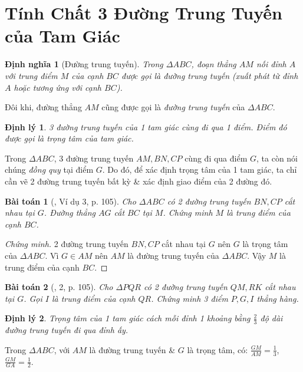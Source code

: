 \documentclass{article}
\newtheorem{baitoan}{Bài toán}
\newtheorem{dinhly}{Định lý}
\newtheorem{dinhnghia}{Định nghĩa}
\begin{document}

\section{Tính Chất 3 Đường Trung Tuyến của Tam Giác}

\begin{dinhnghia}[Đường trung tuyến]
	Trong $\Delta ABC$, đoạn thẳng $AM$ nối đỉnh $A$ với trung điểm $M$ của cạnh $BC$ được gọi là \emph{đường trung tuyến} (xuất phát từ đỉnh $A$ hoặc tương ứng với cạnh $BC$).
\end{dinhnghia}
Đôi khi, đường thẳng $AM$ cũng được gọi là \textit{đường trung tuyến} của $\Delta ABC$.

\begin{dinhly}
	3 đường trung tuyến của 1 tam giác cùng đi qua 1 điểm. Điểm đó được gọi là \emph{trọng tâm} của tam giác.
\end{dinhly}
Trong $\Delta ABC$, 3 đường trung tuyến $AM,BN,CP$ cùng đi qua điểm $G$, ta còn nói chúng \textit{đồng quy} tại điểm $G$. Do đó, để xác định trọng tâm của 1 tam giác, ta chỉ cần vẽ 2 đường trung tuyến bất kỳ \& xác định giao điểm của 2 đường đó.

\begin{baitoan}[\cite{SGK_Toan_7_Canh_Dieu_tap_2}, Ví dụ 3, p. 105]
	Cho $\Delta ABC$ có 2 đường trung tuyến $BN,CP$ cắt nhau tại $G$. Đường thẳng $AG$ cắt $BC$ tại $M$. Chứng minh $M$ là trung điểm của cạnh $BC$.
\end{baitoan}

\begin{proof}[Chứng minh]
	2 đường trung tuyến $BN,CP$ cắt nhau tại $G$ nên $G$ là trọng tâm của $\Delta ABC$. Vì $G\in AM$ nên $AM$ là đường trung tuyến của $\Delta ABC$. Vậy $M$ là trung điểm của cạnh $BC$.
\end{proof}

\begin{baitoan}[\cite{SGK_Toan_7_Canh_Dieu_tap_2}, 2, p. 105]
	Cho $\Delta PQR$ có 2 đường trung tuyến $QM,RK$ cắt nhau tại $G$. Gọi $I$ là trung điểm của cạnh $QR$. Chứng minh 3 điểm $P,G,I$ thẳng hàng.
\end{baitoan}

\begin{dinhly}
	Trọng tâm của 1 tam giác cách mỗi đỉnh 1 khoảng bằng $\frac{2}{3}$ độ dài đường trung tuyến đi qua đỉnh ấy.
\end{dinhly}
Trong $\Delta ABC$, với $AM$ là đường trung tuyến \& $G$ là trọng tâm, có: $\frac{GM}{AM} = \frac{1}{3}$, $\frac{GM}{GA} = \frac{1}{2}$.
\end{document}
